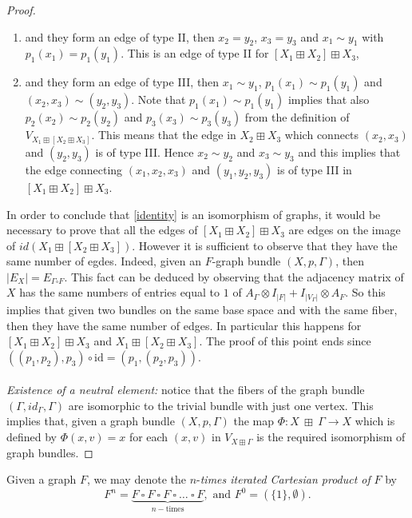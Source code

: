 \documentclass{amsart}
\theoremstyle{definition}
\numberwithin{equation}{section}
\begin{document}
\begin{proof}
\begin{enumerate}
\item[(2).] and they form an edge of type II, then $x_2 = y_2$, $x_3 = y_3$ and $x_1 \sim y_1$ with $p_1(x_1) = p_1(y_1)$. This is an edge of type II for $[X_1 \boxplus X_2] \boxplus X_3$,

\item[(3).] and they form an edge of type III, then $x_1 \sim y_1$, $p_1(x_1) \sim p_1(y_1)$ and $(x_2,x_3) \sim (y_2, y_3)$. Note that $p_1(x_1) \sim p_1(y_1)$ implies that also $p_2(x_2) \sim p_2(y_2)$ and $p_3(x_3) \sim p_3(y_3)$ from the definition of $V_{X_1 \boxplus [X_2 \boxplus X_3]}$. This means that the edge in $X_2 \boxplus X_3$ which connects $(x_2,x_3)$ and $  (y_2, y_3)$ is of type III. Hence $x_2 \sim y_2$ and $x_3 \sim y_3$ and this implies that the edge connecting $(x_1, x_2, x_3)$ and $(y_1, y_2, y_3)$ is of type III in $[X_1 \boxplus X_2] \boxplus X_3$.
\end{enumerate}


In order to conclude that \eqref{identity} is an isomorphism of graphs, it would be necessary to prove that all the edges of $[X_1 \boxplus X_2] \boxplus X_3$ are edges on the image of $id(X_1 \boxplus [X_2 \boxplus X_3])$. However it is sufficient to observe that they have the same number of egdes. Indeed, given an $F$-graph bundle $(X, p, \Gamma)$, then $\vert E_{X} \vert = E_{\Gamma \square F}$. This fact can be deduced by observing that the adjacency matrix of $X$ has the same numbers of entries equal to $1$ of $A_{\Gamma} \otimes I_{\vert F \vert} + I_{\vert V_\Gamma\vert} \otimes A_F$. So this implies that given two bundles on the same base space and with the same fiber, then they have the same number of edges. In particular this happens for $[X_1 \boxplus X_2] \boxplus X_3$ and $X_1 \boxplus [X_2 \boxplus X_3]$. The proof of this point ends since $((p_1,p_2), p_3) \circ \mathrm{id} = (p_1,(p_2, p_3))$.\\
\\
\textit{Existence of a neutral element:} notice that the fibers of the graph bundle $(\Gamma, id_\Gamma, \Gamma)$ are isomorphic to the trivial bundle with just one vertex. This implies that, given a graph bundle $(X, p, \Gamma)$ the map $\Phi: X \ \boxplus \ \Gamma \longrightarrow X$ which is defined by $\Phi(x, v) = x$ for each $(x,v)$ in $V_{X \boxplus \Gamma}$ is the required isomorphism of graph bundles.
\end{proof}
Given  a graph $F$, we may denote the $n$-\textit{times iterated Cartesian product of} $F$ by 
\begin{equation}\label{iteration}
F^n = \underbrace{F \ \square  \  F \ \square  \  F \ \square  \  \ldots \ \square  \  F}_{n -\mbox{times}}, \mbox{ and } F^0 = (\{1\}, \emptyset).
\end{equation} 
\end{document}

